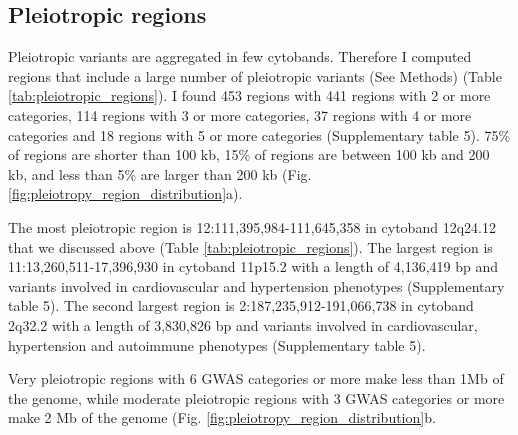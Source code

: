 
%

\subsection*{Pleiotropic regions}

Pleiotropic variants are aggregated in few cytobands.
%
Therefore I computed regions that include a large number of pleiotropic variants (See Methods) (Table \ref{tab:pleiotropic_regions}).
%
I found 453 regions with 441 regions with 2 or more categories, 114 regions with 3 or more categories, 37 regions with 4 or more categories and 18 regions with 5 or more categories (Supplementary table 5).
%
75\% of regions are shorter than 100 kb, 15\% of regions are between 100 kb and 200 kb, and less than 5\% are larger than 200 kb (Fig. \ref{fig:pleiotropy_region_distribution}a).

The most pleiotropic region is 12:111,395,984-111,645,358 in cytoband 12q24.12 that we discussed above (Table \ref{tab:pleiotropic_regions}).
%
The largest region is 11:13,260,511-17,396,930 in cytoband 11p15.2 with a length of 4,136,419 bp and variants involved in cardiovascular and hypertension phenotypes (Supplementary table 5).
%
The second largest region is 2:187,235,912-191,066,738 in cytoband 2q32.2 with a length of 3,830,826 bp and variants involved in cardiovascular, hypertension and autoimmune phenotypes  (Supplementary table 5).

Very pleiotropic regions with 6 GWAS categories or more make less than 1Mb of the genome, while moderate pleiotropic regions with 3 GWAS categories or more make 2 Mb of the genome (Fig. \ref{fig:pleiotropy_region_distribution}b.

